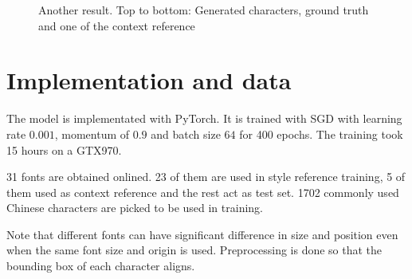 \documentclass[10pt,twocolumn,letterpaper]{article}
\begin{document}
\begin{figure}[t]
\begin{center}
	\end{center}
	\caption{Another result. Top to bottom: Generated characters, ground truth and one of the context reference}
	\label{fig:long}
	\label{fig:onecol}
\end{figure}

\section{Implementation and data}
The model is implementated with PyTorch. It is trained with SGD with learning rate $0.001$, momentum of $0.9$ and batch size $64$ for 400 epochs. The training took 15 hours on a GTX970.

31 fonts are obtained onlined. 23 of them are used in style reference training, 5 of them used as context reference and the rest act as test set. 1702 commonly used Chinese characters are picked to be used in training.

Note that different fonts can have significant difference in size and position even when the same font size and origin is used. Preprocessing is done so that the bounding box of each character aligns.

{\small


}
\end{document}
